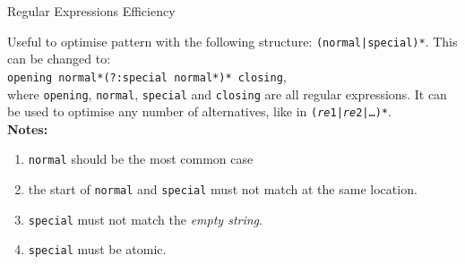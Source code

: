 \documentclass[11pt, a4paper, landscape]{scrartcl}
\newcommand{\regex}[1]{\texttt{#1}}
\newcommand{\cregex}[1]{\colorbox{gray!30}{\regex{#1}}}
\newcommand{\re}{\textit{re}}
\begin{document}
\begin{cheatsheet}{Regular Expressions Efficiency}
\begin{col2}
\end{col2}

\begin{col3}


Useful to optimise pattern with the following structure:
\cregex{(normal|special)*}. This can be changed to:\\
\cregex{opening normal*(?:special normal*)* closing},\\
where \regex{opening}, \regex{normal}, \regex{special} and \regex{closing} are
all regular expressions. It can be used to optimise any number of alternatives,
like in \cregex{(\re{}1|\re{}2|\dots)*}.\\
\textbf{Notes:}
\begin{enumerate}
	\item \regex{normal} should be the most common case
	\item the start of \regex{normal} and \regex{special} must not match at the
		same location.
	\item \regex{special} must not match the \emph{empty string}.
	\item \regex{special} must be atomic.
\end{enumerate}

\end{col3}

\end{cheatsheet}

\newpage
\end{document}
